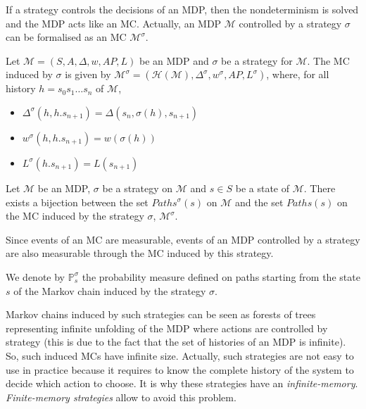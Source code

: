 If a strategy controls the decisions of an MDP, then the nondeterminism is solved
and the MDP acts like an MC. Actually, an MDP $\mathcal{M}$ controlled by a strategy $\sigma$ can be formalised as an MC $\mathcal{M}^\sigma$.

\begin{definition}
Let $\mathcal{M} = (S, A, \Delta, w, AP, L)$ be an MDP and $\sigma$ be a strategy for
$\mathcal{M}$. The MC induced by $\sigma$ is given by
$ \mathcal{M}^\sigma = (\mathcal{H}(\mathcal{M}), \Delta^\sigma, w^\sigma, AP, L^\sigma) $, where, for all history
$h = s_0 s_1 \dots s_n$ of $\mathcal{M}$,
\begin{itemize}
\item $\Delta^\sigma(h, h . s_{n+1}) = \Delta(s_n, \sigma(h), s_{n+1})$
\item $w^\sigma(h, h . s_{n+1}) = w(\sigma(h))$
\item $L^\sigma(h . s_{n+1}) = L(s_{n+1})$
\end{itemize}
\end{definition}

\begin{property}
  Let $\mathcal{M}$ be an MDP, $\sigma$ be a strategy on $\mathcal{M}$ and $s\in S$ be a state of $\mathcal{M}$. There exists a bijection between the
  set $Paths^\sigma(s)$ on $\mathcal{M}$ and the set $Paths(s)$ on the MC induced by the strategy $\sigma$, $\mathcal{M}^\sigma$.
\end{property}
Since events of an MC are measurable, events of an MDP controlled by a strategy are also measurable through the MC induced by this strategy.
\begin{notation}
  We denote by $\mathbb{P}_s^\sigma$ the probability measure defined on paths starting from the state $s$ of the Markov chain induced by the strategy $\sigma$.
\end{notation}

Markov chains induced by such strategies can be seen as forests of trees representing infinite
unfolding of the MDP where actions are controlled by
strategy (this is due to the fact that the set of histories
of an MDP is infinite). So, such induced MCs have infinite
size. Actually, such strategies are not easy to use in practice because it requires to
know the complete history of the system to decide which action to choose. It is why these strategies have an \textit{infinite-memory}. \textit{Finite-memory strategies} allow to avoid this problem.

